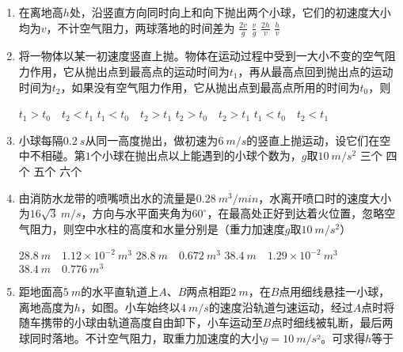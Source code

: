 \begin{enumerate}[leftmargin=0em]
\begin{minipage}[h!]{0.7\linewidth}
\vspace{0.3em}
\end{minipage}
\hfill
\begin{minipage}[h!]{0.3\linewidth}
\flushright
\vspace{0.3em}

\vspace{0.3em}
\end{minipage}


\item 
{}
在离地高$ h $处，沿竖直方向同时向上和向下抛出两个小球，它们的初速度大小均为$ v $，不计空气阻力，两球落地的时间差为  
\fourchoices
{$ \frac{2v}{g} $}
{$ \frac{v}{g} $}
{$ \frac{2h}{v} $}
{$ \frac{h}{v} $}





\item
{}
将一物体以某一初速度竖直上抛。物体在运动过程中受到一大小不变的空气阻力作用，它从抛出点到最高点的运动时间为$ t_{1} $，再从最高点回到抛出点的运动时间为$ t_{2} $，如果没有空气阻力作用，它从抛出点到最高点所用的时间为$ t_{0} $，则  

\fourchoices
{$ t _ { 1 } > t _ { 0 } \quad t _ { 2 } < t _ { 1 } $}
{$ t _ { 1 } < t _ { 0 } \quad t _ { 2 } > t _ { 1 } $}
{$ t _ { 2 } > t _ { 0 } \quad t _ { 2 } > t _ { 1 } $}
{$ t _ { 1 } < t _ { 0 } \quad t _ { 2 } < t _ { 1 } $}


\item
{}
小球每隔$ 0.2 \ s $从同一高度抛出，做初速为$ 6 \ m/s $的竖直上抛运动，设它们在空中不相碰。第$ 1 $个小球在抛出点以上能遇到的小球个数为，$ g $取$ 10 \ m/s ^{2} $  
\fourchoices
{三个}
{四个}
{五个}
{六个}




\item 
{}
由消防水龙带的喷嘴喷出水的流量是$ 0.28\ m^{3}/min $，水离开喷口时的速度大小为$ 16\sqrt{3} \ m/s $，方向与水平面夹角为$ 60 ^{ \circ } $，在最高处正好到达着火位置，忽略空气阻力，则空中水柱的高度和水量分别是（重力加速度$ g $取$ 10 \ m/s ^{2} $）  


\fourchoices
{$ 28.8\ m \quad 1.12 \times 10^{-2} \ m^{3} $ }
{$ 28.8\ m \quad 0.672 \ m^{3} $}
{$ 38.4\ m \quad 1.29 \times 10^{-2} \ m^{3} $ }
{$ 38.4\ m \quad 0.776 \ m^{3} $}

\item
{}
距地面高$ 5 \ m $的水平直轨道上$ A $、$ B $两点相距$ 2 \ m $，在$ B $点用细线悬挂一小球，离地高度为$ h $，如图。小车始终以$ 4 \ m/s $的速度沿轨道匀速运动，经过$ A $点时将随车携带的小球由轨道高度自由卸下，小车运动至$ B $点时细线被轧断，最后两球同时落地。不计空气阻力，取重力加速度的大小$ g=10 \ m/s $²。可求得$ h $等于  
\begin{figure}[h!]
\centering

\end{figure}



\end{enumerate}

